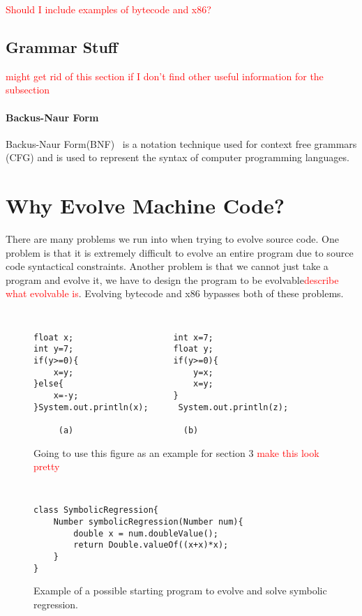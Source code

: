 \documentclass{sig-alternate}
\newcommand{\mycomment}[1]{\textcolor{red}{#1}}
\begin{document}
\mycomment{Should I include examples of bytecode and x86?}


\subsection{Grammar Stuff}
\mycomment{might get rid of this section if I don't find other useful information for the subsection}
\paragraph{Backus-Naur Form}
	Backus-Naur Form(BNF)~\cite{BNF:2014} is a notation technique used for context free grammars (CFG) and is used to represent the syntax of computer programming languages.




\section{Why Evolve Machine Code?}

There are many problems we run into when trying to evolve source code. One problem is that it is extremely difficult to evolve an entire program due to source code syntactical constraints. Another problem is that we cannot just take a program and evolve it, we have to design the program to be evolvable\mycomment{describe what evolvable is}. Evolving bytecode and x86 bypasses both of these problems.

\begin{figure}
\centering
{\tt
\begin{verbatim}
float x;                    int x=7;
int y=7;                    float y;
if(y>=0){                   if(y>=0){
    x=y;                        y=x;
}else{                          x=y;
    x=-y;                   }
}System.out.println(x);      System.out.println(z);	
     
     (a)                      (b)

\end{verbatim}
}
\caption{Going to use this figure as an example for section 3 \mycomment{make this look pretty}}
\end{figure}


\begin{figure}
\centering
{\tt
\begin{verbatim}
class SymbolicRegression{
    Number symbolicRegression(Number num){
        double x = num.doubleValue();
        return Double.valueOf((x+x)*x);
    }
}
\end{verbatim}
}
\caption{Example of a possible starting program to evolve and solve symbolic regression.}
\end{figure}
\end{document}
